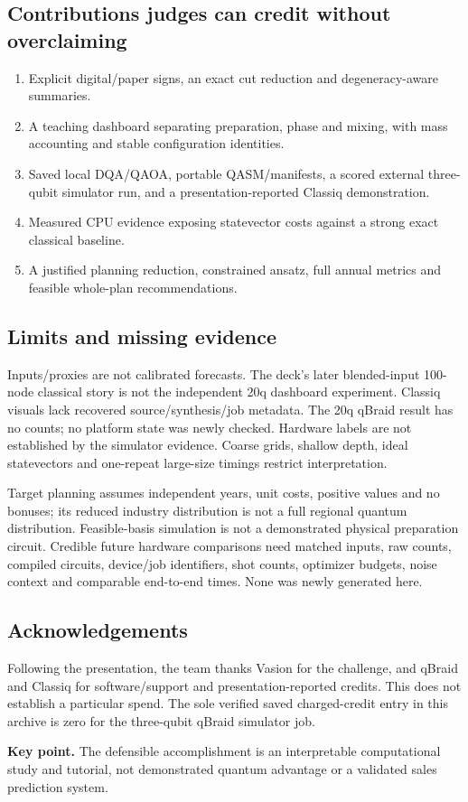 \documentclass[11pt,letterpaper]{article}
\newcommand{\page}{\clearpage}
\newcommand{\takeaway}[1]{\par\smallskip\textbf{Key point.} #1\par}
\begin{document}
\subsection{Contributions judges can credit without overclaiming}
\begin{enumerate}
 \item Explicit digital/paper signs, an exact cut reduction and degeneracy-aware summaries.
 \item A teaching dashboard separating preparation, phase and mixing, with mass accounting and stable configuration identities.
 \item Saved local DQA/QAOA, portable QASM/manifests, a scored external three-qubit simulator run, and a presentation-reported Classiq demonstration.
 \item Measured CPU evidence exposing statevector costs against a strong exact classical baseline.
 \item A justified planning reduction, constrained ansatz, full annual metrics and feasible whole-plan recommendations.
\end{enumerate}

\subsection{Limits and missing evidence}
Inputs/proxies are not calibrated forecasts. The deck's later blended-input 100-node classical story is not the independent 20q dashboard experiment. Classiq visuals lack recovered source/synthesis/job metadata. The 20q qBraid result has no counts; no platform state was newly checked. Hardware labels are not established by the simulator evidence. Coarse grids, shallow depth, ideal statevectors and one-repeat large-size timings restrict interpretation.

Target planning assumes independent years, unit costs, positive values and no bonuses; its reduced industry distribution is not a full regional quantum distribution. Feasible-basis simulation is not a demonstrated physical preparation circuit. Credible future hardware comparisons need matched inputs, raw counts, compiled circuits, device/job identifiers, shot counts, optimizer budgets, noise context and comparable end-to-end times. None was newly generated here.

\subsection{Acknowledgements}
Following the presentation, the team thanks Vasion for the challenge, and qBraid and Classiq for software/support and presentation-reported credits. This does not establish a particular spend. The sole verified saved charged-credit entry in this archive is zero for the three-qubit qBraid simulator job.
\takeaway{The defensible accomplishment is an interpretable computational study and tutorial, not demonstrated quantum advantage or a validated sales prediction system.}
\page
\appendix
\end{document}
